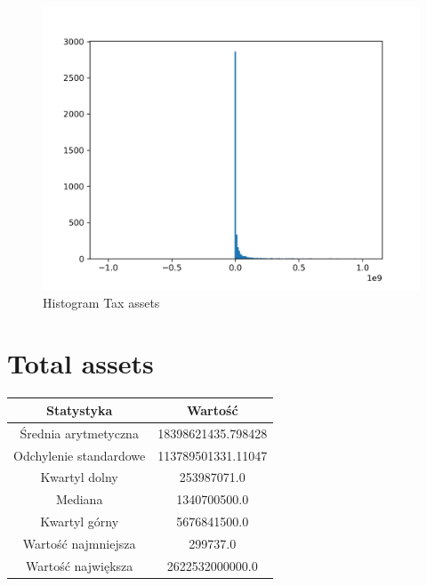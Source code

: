 \documentclass{article}
\begin{document}
\begin{figure}[h!]
    \includegraphics[width=\linewidth]{variables/Tax assets.png}
    \caption{Histogram Tax assets }
\end{figure}\section{ Total assets }

\begin{center}
    \begin{tabular}{|c | c|} 
    \hline
    Statystyka & Wartość \\
    \hline\hline
    Średnia arytmetyczna & 18398621435.798428 \\ 
    \hline
    Odchylenie standardowe & 113789501331.11047 \\
    \hline
    Kwartyl dolny & 253987071.0 \\
    \hline
    Mediana & 1340700500.0 \\
    \hline
    Kwartyl górny & 5676841500.0 \\
    \hline
    Wartość najmniejsza & 299737.0 \\
    \hline
    Wartość największa & 2622532000000.0 \\
    \hline
   \end{tabular}
\end{center}
\end{document}
